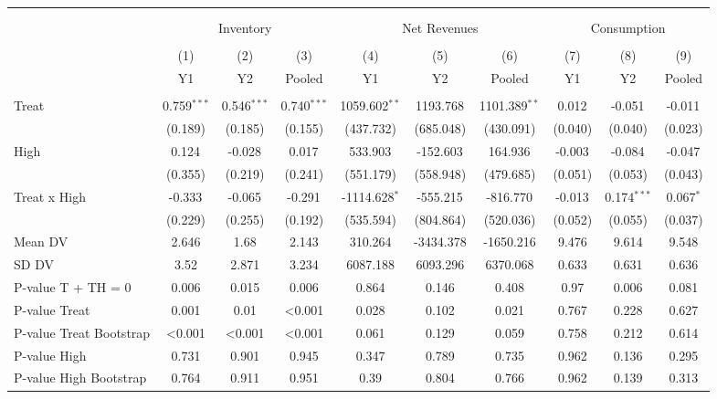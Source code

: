 \begin{tabular}{@{\extracolsep{5pt}}lccccccccc}
\\[-1.8ex]\hline
\hline \\[-1.8ex]
\\[-1.8ex] & \multicolumn{3}{c}{Inventory} & \multicolumn{3}{c}{Net Revenues} & \multicolumn{3}{c}{Consumption}  \\
\\[-1.8ex] & (1) & (2) & (3) & (4) & (5) & (6) & (7) & (8) & (9) 
 \\ & Y1 & Y2 & Pooled & Y1 & Y2 & Pooled & Y1 & Y2 & Pooled \\
\hline \\[-1.8ex]
 Treat & 0.759$^{***}$ & 0.546$^{***}$ & 0.740$^{***}$ & 1059.602$^{**}$ & 1193.768$^{}$ & 1101.389$^{**}$ & 0.012$^{}$ & -0.051$^{}$ & -0.011$^{}$ \\
& (0.189) & (0.185) & (0.155) & (437.732) & (685.048) & (430.091) & (0.040) & (0.040) & (0.023) \\
 High & 0.124$^{}$ & -0.028$^{}$ & 0.017$^{}$ & 533.903$^{}$ & -152.603$^{}$ & 164.936$^{}$ & -0.003$^{}$ & -0.084$^{}$ & -0.047$^{}$ \\
& (0.355) & (0.219) & (0.241) & (551.179) & (558.948) & (479.685) & (0.051) & (0.053) & (0.043) \\
 Treat x High & -0.333$^{}$ & -0.065$^{}$ & -0.291$^{}$ & -1114.628$^{*}$ & -555.215$^{}$ & -816.770$^{}$ & -0.013$^{}$ & 0.174$^{***}$ & 0.067$^{*}$ \\
& (0.229) & (0.255) & (0.192) & (535.594) & (804.864) & (520.036) & (0.052) & (0.055) & (0.037) \\
 Mean DV & 2.646 & 1.68 & 2.143 & 310.264 & -3434.378 & -1650.216 & 9.476 & 9.614 & 9.548 \\
 SD DV & 3.52 & 2.871 & 3.234 & 6087.188 & 6093.296 & 6370.068 & 0.633 & 0.631 & 0.636 \\
 P-value T + TH = 0 & 0.006 & 0.015 & 0.006 & 0.864 & 0.146 & 0.408 & 0.97 & 0.006 & 0.081 \\
 P-value Treat & 0.001 & 0.01 & <0.001 & 0.028 & 0.102 & 0.021 & 0.767 & 0.228 & 0.627 \\
 P-value Treat Bootstrap & <0.001 & <0.001 & <0.001 & 0.061 & 0.129 & 0.059 & 0.758 & 0.212 & 0.614 \\
 P-value High & 0.731 & 0.901 & 0.945 & 0.347 & 0.789 & 0.735 & 0.962 & 0.136 & 0.295 \\
 P-value High Bootstrap & 0.764 & 0.911 & 0.951 & 0.39 & 0.804 & 0.766 & 0.962 & 0.139 & 0.313 \\

\end{tabular}
